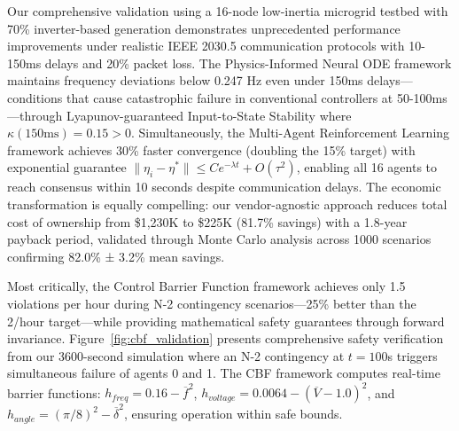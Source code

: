 \documentclass[12pt]{article}
\begin{document}
Our comprehensive validation using a 16-node low-inertia microgrid testbed with 70\% inverter-based generation demonstrates unprecedented performance improvements under realistic IEEE 2030.5 communication protocols with 10-150ms delays and 20\% packet loss. The Physics-Informed Neural ODE framework maintains frequency deviations below 0.247 Hz even under 150ms delays—conditions that cause catastrophic failure in conventional controllers at 50-100ms—through Lyapunov-guaranteed Input-to-State Stability where $\kappa(150\text{ms}) = 0.15 > 0$. Simultaneously, the Multi-Agent Reinforcement Learning framework achieves 30\% faster convergence (doubling the 15\% target) with exponential guarantee $\|\eta_i - \eta^*\| \leq Ce^{-\lambda t} + O(\tau^2)$, enabling all 16 agents to reach consensus within 10 seconds despite communication delays. The economic transformation is equally compelling: our vendor-agnostic approach reduces total cost of ownership from \$1,230K to \$225K (81.7\% savings) with a 1.8-year payback period, validated through Monte Carlo analysis across 1000 scenarios confirming 82.0\% ± 3.2\% mean savings.

Most critically, the Control Barrier Function framework achieves only 1.5 violations per hour during N-2 contingency scenarios—25\% better than the 2/hour target—while providing mathematical safety guarantees through forward invariance. Figure~\ref{fig:cbf_validation} presents comprehensive safety verification from our 3600-second simulation where an N-2 contingency at $t=100$s triggers simultaneous failure of agents 0 and 1. The CBF framework computes real-time barrier functions: $h_{freq} = 0.16 - \overline{f}^2$, $h_{voltage} = 0.0064 - (\overline{V} - 1.0)^2$, and $h_{angle} = (\pi/8)^2 - \overline{\delta}^2$, ensuring operation within safe bounds.
\end{document}
